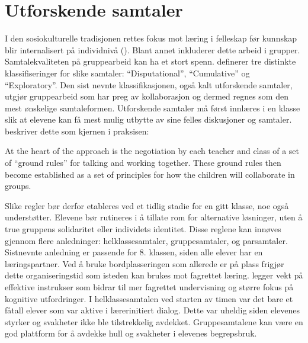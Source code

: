 \documentclass[12pt,twoside,onecolumn,norsk]{article}
\begin{document}
\section*{Utforskende samtaler}
I den sosiokulturelle tradisjonen rettes 
fokus mot læring i felleskap før kunnskap blir internalisert på individnivå (). 
Blant annet inkluderer dette arbeid i grupper. Samtalekvaliteten på gruppearbeid kan ha et stort spenn. 
 definerer tre distinkte klassifiseringer for slike samtaler:
``Disputational'', ``Cumulative'' og ``Exploratory''. Den sist nevnte klassifikasjonen,
også kalt utforskende samtaler, utgjør gruppearbeid som har preg av kollaborasjon og dermed 
regnes som den mest ønskelige samtaleformen. 
\newline
\newline
Utforskende samtaler må først innlæres i en klasse slik at elevene kan få mest mulig
utbytte av sine felles diskusjoner og samtaler.  beskriver dette som kjernen i 
praksisen:
\begin{displayquote}
At the heart of the approach is the negotiation by each teacher and class of a set of ``ground
rules'' for talking and working together. These ground rules then become established as a set of 
principles for how the children will collaborate in groups.
\end{displayquote}
Slike regler bør derfor etableres ved et tidlig stadie for en gitt klasse, noe 
også understøtter. Elevene bør rutineres i å tillate rom for alternative løsninger, uten å true 
gruppens solidaritet eller individets identitet. Disse reglene kan innøves gjennom flere 
anledninger: helklassesamtaler, gruppesamtaler, og parsamtaler. Sistnevnte anledning er passende
for 8. klassen, siden alle elever har en læringspartner. Ved å bruke bordplasseringen som allerede 
er på plass frigjør dette organiseringstid som isteden kan brukes mot fagrettet læring. 
 legger vekt på effektive instrukser som bidrar til mer fagrettet undervisning og 
større fokus på kognitive utfordringer.
\newline
\newline
I helklassesamtalen ved starten av timen var det bare et fåtall elever som var aktive i lærerinitiert 
dialog. Dette var uheldig siden elevenes styrker og svakheter ikke ble tilstrekkelig avdekket. 
Gruppesamtalene kan være en god plattform for å avdekke hull og svakheter i elevenes begrepsbruk.
\newline
\end{document}
